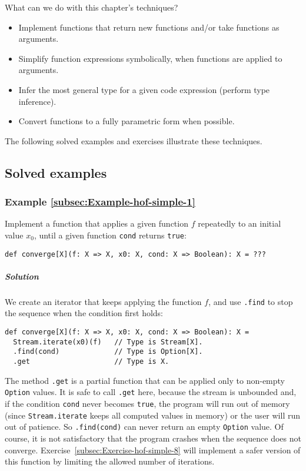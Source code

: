 What can we do with this chapter's techniques?
\begin{itemize}
\item Implement functions that return new functions and/or take functions
as arguments.
\item Simplify function expressions symbolically, when functions are applied
to arguments.
\item Infer the most general type for a given code expression (perform type
inference).
\item Convert functions to a fully parametric form when possible.
\end{itemize}
The following solved examples and exercises illustrate these techniques.

\subsection{Solved examples}

\subsubsection{Example \label{subsec:Example-hof-simple-1}\ref{subsec:Example-hof-simple-1}}

Implement a function that applies a given function $f$ repeatedly
to an initial value $x_{0}$, until a given function \lstinline!cond!
returns \lstinline!true!:
\begin{lstlisting}
def converge[X](f: X => X, x0: X, cond: X => Boolean): X = ???
\end{lstlisting}


\subparagraph{Solution}

We create an iterator that keeps applying the function $f$, and use
\lstinline!.find! to stop the sequence when the condition first holds:
\begin{lstlisting}
def converge[X](f: X => X, x0: X, cond: X => Boolean): X = 
  Stream.iterate(x0)(f)   // Type is Stream[X].
  .find(cond)             // Type is Option[X].
  .get                    // Type is X.
\end{lstlisting}
The method \lstinline!.get! is a partial
function that can be applied only to non-empty \lstinline!Option!
values. It is safe to call \lstinline!.get! here, because the stream
is unbounded and, if the condition \lstinline!cond! never becomes
\lstinline!true!, the program will run out of memory (since \lstinline!Stream.iterate!
keeps all computed values in memory) or the user will run out of patience.
So \lstinline!.find(cond)! can never return an empty \lstinline!Option!
value. Of course, it is not satisfactory that the program crashes
when the sequence does not converge. Exercise~\ref{subsec:Exercise-hof-simple-8}
will implement a safer version of this function by limiting the allowed
number of iterations.

